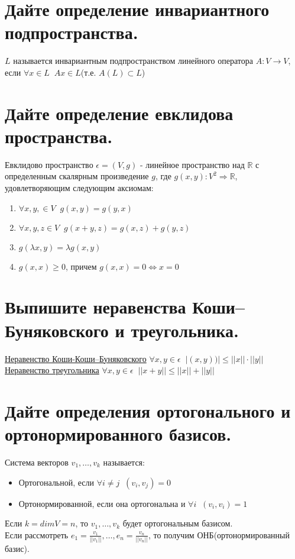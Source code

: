 \documentclass{article}
\newcommand{\R}[0]{
    \mathbb{R}
}
\begin{document}
\section{Дайте определение инвариантного подпространства.}
$L$ называется инвариантным подпространством линейного оператора
$A: V \longrightarrow V$, если $\forall x \in L \;\; Ax \in L$(т.е. $A(L) \subset L$)

\section{Дайте определение евклидова пространства.}
Евклидово пространство $\epsilon = (V, g)$ - линейное пространство над $\R$ с определенным скалярным произведение $g$,
где $g(x, y): V^2 \Longrightarrow \R$, удовлетворяющим следующим аксиомам:
\begin{enumerate}
    \item $\forall x, y, \in V \;\; g(x, y) = g(y, x)$
    \item $\forall x, y, z \in V \;\; g(x + y, z) = g(x, z) + g(y, z)$
    \item $g(\lambda x, y) = \lambda g(x, y)$
    \item $g(x, x) \geq 0$, причем $g(x, x) = 0 \iff x = 0$
\end{enumerate}

\section{Выпишите неравенства Коши–Буняковского и треугольника.}
\underline{Неравенство Коши-Коши–Буняковского} $\forall x, y \in \epsilon \;\; |(x, y))| \leq ||x|| \cdot ||y||$
\\
\underline{Неравенство треугольника} $\forall x, y \in \epsilon \;\; ||x + y|| \leq ||x|| + ||y||$

\section{Дайте определения ортогонального и ортонормированного базисов.}
Система векторов $v_1, \ldots, v_k$ называется:
\begin{itemize}
    \item Ортогональной, если $\forall i \neq j \;\; (v_i, v_j) = 0$
    \item Ортонормированной, если она ортогональна и $\forall i \;\; (v_i, v_i) = 1$
\end{itemize}
Если $k = dim V = n$, то $v_1, \ldots, v_k$ будет ортогональным базисом.
\\
Если рассмотреть $e_1 = \frac{v_1}{||v_1||}, \ldots, e_n = \frac{v_n}{||v_n||}$, то
получим ОНБ(ортонормированный базис).
\end{document}
